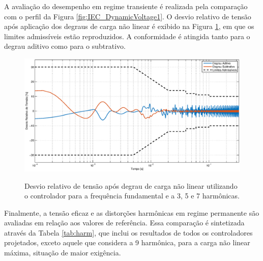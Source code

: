 \documentclass[repeatfields,oneside,overleaf]{tcc}
\begin{document}
\newpage
A avaliação do desempenho em regime transiente é realizada pela comparação com o perfil da Figura \ref{fig:IEC_DynamicVoltage1}.
O desvio relativo de tensão após aplicação dos degraus de carga não linear é exibido na Figura \ref{fig:iec_7}, em que os limites admissíveis estão reproduzidos.
A conformidade é atingida tanto para o degrau aditivo como para o subtrativo.

\begin{figure}[h]
    \centering
    \caption{Desvio relativo de tensão após degrau de carga não linear utilizando o controlador para a frequência fundamental e a 3{\textordfeminine}, 5{\textordfeminine} e 7{\textordfeminine} harmônicas.}
    \includegraphics[trim={80 20 80 20}, clip, width=0.7\linewidth]{fig/IEC_7.eps}
    \\
    \label{fig:iec_7}
\end{figure}

Finalmente, a tensão eficaz e as distorções harmônicas em regime permanente são avaliadas em relação aos valores de referência.
Essa comparação é sintetizada através da Tabela \ref{tab:harm}, que inclui os resultados de todos os controladores projetados, exceto aquele que considera a 9{\textordfeminine} harmônica, para a carga não linear máxima, situação de maior exigência.
\end{document}
